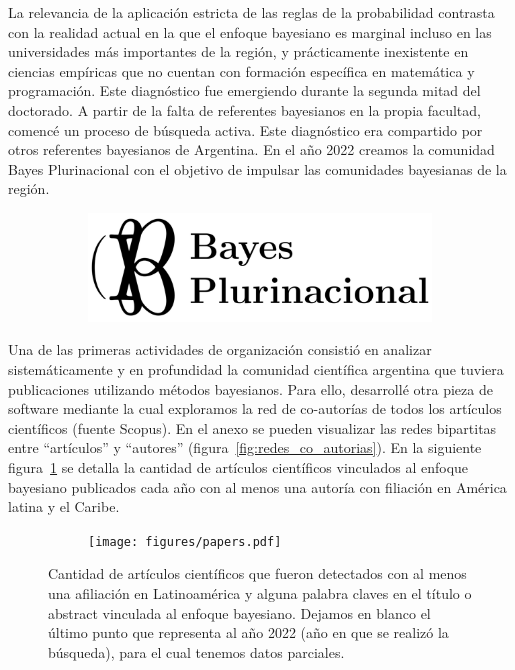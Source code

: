\documentclass[a4paper,11pt]{book}
\theoremstyle{definition}
\begin{document}
La relevancia de la aplicaci\'on estricta de las reglas de la probabilidad contrasta con la realidad actual en la que el enfoque bayesiano es marginal incluso en las universidades m\'as importantes de la regi\'on, y pr\'acticamente inexistente en ciencias emp\'iricas que no cuentan con formaci\'on espec\'ifica en matem\'atica y programaci\'on.
%
Este diagn\'ostico fue emergiendo durante la segunda mitad del doctorado.
%
A partir de la falta de referentes bayesianos en la propia facultad, comenc\'e un proceso de b\'usqueda activa.
%
Este diagn\'ostico era compartido por otros referentes bayesianos de Argentina.
%
En el a\~no 2022 creamos la comunidad Bayes Plurinacional con el objetivo de impulsar las comunidades bayesianas de la regi\'on.
%
\begin{figure}[ht!]
\centering
  \begin{subfigure}[b]{0.45\textwidth}
  \includegraphics[page=1,width=\textwidth]{static/BP.pdf}
  \end{subfigure}
\end{figure}


Una de las primeras actividades de organizaci\'on consisti\'o en analizar sistem\'aticamente y en profundidad la comunidad cient\'ifica argentina que tuviera publicaciones utilizando m\'etodos bayesianos.
%
Para ello, desarroll\'e otra pieza de software mediante la cual exploramos la red de co-autor\'ias de todos los art\'iculos cient\'ificos (fuente Scopus).
%
En el anexo se pueden visualizar las redes bipartitas entre ``art\'iculos'' y ``autores'' (figura~\ref{fig:redes_co_autorias}).
%
En la siguiente figura~\ref{fig:papers_bayesianos} se detalla la cantidad de art\'iculos cient\'ificos vinculados al enfoque bayesiano publicados cada a\~no con al menos una autor\'ia con filiaci\'on en Am\'erica latina y el Caribe.


\begin{figure}[ht!]
\centering
  \begin{subfigure}[b]{0.60\textwidth}
  \texttt{[image: figures/papers.pdf]}
  \end{subfigure}
  \caption{Cantidad de art\'iculos cient\'ificos que fueron detectados con al menos una afiliaci\'on en Latinoam\'erica y alguna palabra claves en el t\'itulo o abstract vinculada al enfoque bayesiano. Dejamos en blanco el \'ultimo punto que representa al a\~no 2022 (a\~no en que se realiz\'o la b\'usqueda), para el cual tenemos datos parciales.}
  \label{fig:papers_bayesianos}
\end{figure}
\end{document}
